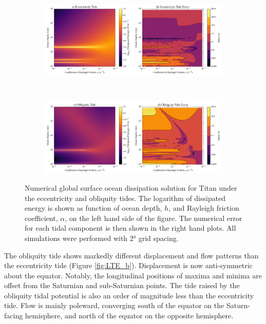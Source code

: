 \begin{figure}[!t]
\centering
\begin{subfigure}{0.9\linewidth}
\centering
\includegraphics[width=\linewidth]{Figures/Eccentricity_error}
\subcaption{\label{fig:lincEccTitan}}
\end{subfigure}\\\vspace*{-0.5cm}
\begin{subfigure}{0.9\linewidth}
\centering
\includegraphics[width=\linewidth]{Figures/Obliquity_error}
\subcaption{\label{fig:linObliqTitan}}
\end{subfigure}
\vspace*{-0.8cm}
\caption{Numerical global surface ocean dissipation solution for Titan under the eccentricity and obliquity tides. The logarithm of dissipated energy is shown as function of ocean depth, $h$, and Rayleigh friction coefficient, $\alpha$, on the left hand side of the figure. The numerical error for each tidal component is then shown in the right hand plots. All simulations were performed with $\ang{2}$ grid spacing. \label{fig:linTitan}}
\end{figure}

The obliquity tide shows markedly different displacement and flow patterns than the eccentricity tide (Figure \ref{fig:LTE_b}). Displacement is now anti-symmetric about the equator. Notably, the longitudinal positions of maxima and minima are offset from the Saturnian and sub-Saturnian points. The tide raised by the obliquity tidal potential is also an order of magnitude less than the eccentricity tide. Flow is mainly poleward, converging south of the equator on the Saturn-facing hemisphere, and north of the equator on the opposite hemisphere.

